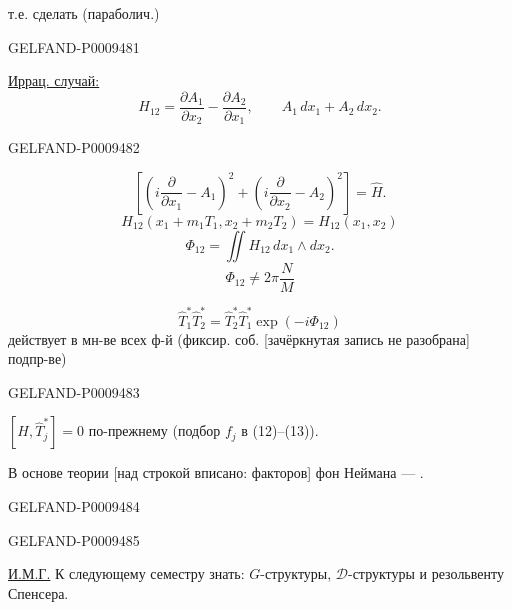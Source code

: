 т.е. сделать  (параболич.)

\begin{GelfandAdjacentEvidence}{GELFAND-P000948}{1}

\underline{Иррац. случай:}
\[
 H_{12}=\frac{\partial A_1}{\partial x_2}-\frac{\partial A_2}{\partial x_1},
 \qquad A_1\,dx_1+A_2\,dx_2.
\]
\end{GelfandAdjacentEvidence}
\begin{GelfandAdjacentEvidence}{GELFAND-P000948}{2}

\[
 \left[\left(i\frac{\partial}{\partial x_1}-A_1\right)^2+
 \left(i\frac{\partial}{\partial x_2}-A_2\right)^2\right]=\hat H.
\]
\[
 H_{12}(x_1+m_1T_1,x_2+m_2T_2)=H_{12}(x_1,x_2)
\]
\[
 \Phi_{12}=\iint H_{12}\,dx_1\wedge dx_2.
\]
\[
 \Phi_{12}\ne2\pi\frac{N}{M}
\]

\[
 \hat T_1^*\hat T_2^*=\hat T_2^*\hat T_1^*\exp(-i\Phi_{12})
\]
действует в мн-ве всех ф-й (фиксир. соб. [зачёркнутая запись не разобрана] подпр-ве)
\end{GelfandAdjacentEvidence}
\begin{GelfandAdjacentEvidence}{GELFAND-P000948}{3}


$[H,\hat T_j^*]=0$ по-прежнему (подбор $f_j$ в (12)--(13)).

В основе теории [над строкой вписано: факторов] фон Неймана --- .
\end{GelfandAdjacentEvidence}
\begin{GelfandAdjacentEvidence}{GELFAND-P000948}{4}

\end{GelfandAdjacentEvidence}
\begin{GelfandAdjacentEvidence}{GELFAND-P000948}{5}


\underline{И.М.Г.} К следующему семестру знать: $G$-структуры, $\mathcal D$-структуры и резольвенту Спенсера.
\end{GelfandAdjacentEvidence}



